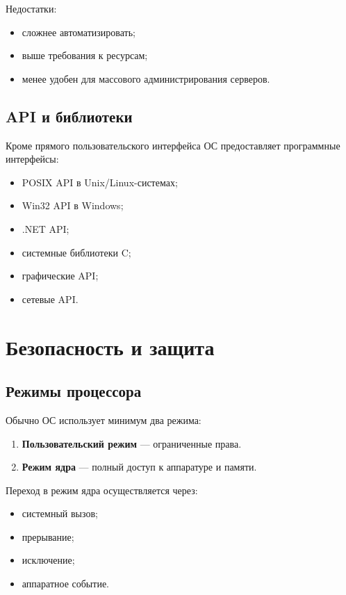 \documentclass[12pt,a4paper]{article}
\begin{document}
Недостатки:

\begin{itemize}
    \item сложнее автоматизировать;
    \item выше требования к ресурсам;
    \item менее удобен для массового администрирования серверов.
\end{itemize}

\subsection{API и библиотеки}

Кроме прямого пользовательского интерфейса ОС предоставляет программные интерфейсы:

\begin{itemize}
    \item POSIX API в Unix/Linux-системах;
    \item Win32 API в Windows;
    \item .NET API;
    \item системные библиотеки C;
    \item графические API;
    \item сетевые API.
\end{itemize}

\section{Безопасность и защита}

\subsection{Режимы процессора}

Обычно ОС использует минимум два режима:

\begin{enumerate}
    \item \textbf{Пользовательский режим} --- ограниченные права.
    \item \textbf{Режим ядра} --- полный доступ к аппаратуре и памяти.
\end{enumerate}

Переход в режим ядра осуществляется через:

\begin{itemize}
    \item системный вызов;
    \item прерывание;
    \item исключение;
    \item аппаратное событие.
\end{itemize}
\end{document}
